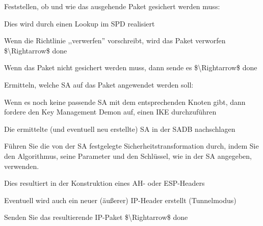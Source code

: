 \documentclass[a4paper]{article}
\begin{document}
\begin{multicols}{3}
\begin{itemize*}
            \begin{itemize*}
                  \item Feststellen, ob und wie das ausgehende Paket gesichert werden muss:
                  \begin{itemize*}
                        \item Dies wird durch einen Lookup im SPD realisiert
                        \item Wenn die Richtlinie ,,verwerfen'' vorschreibt, wird das Paket verworfen \$\textbackslash Rightarrow\$ done
                        \item Wenn das Paket nicht gesichert werden muss, dann sende es \$\textbackslash Rightarrow\$ done
                  \end{itemize*}
                  \item Ermitteln, welche SA auf das Paket angewendet werden soll:
                  \begin{itemize*} \item Wenn es noch keine passende SA mit dem entsprechenden Knoten gibt, dann fordere den Key Management Demon auf, einen IKE durchzuführen \end{itemize*}
                  \item Die ermittelte (und eventuell neu erstellte) SA in der SADB nachschlagen
                  \item Führen Sie die von der SA festgelegte Sicherheitstransformation durch, indem Sie den Algorithmus, seine Parameter und den Schlüssel, wie in der SA angegeben, verwenden.
                  \begin{itemize*}
                        \item Dies resultiert in der Konstruktion eines AH- oder ESP-Headers
                        \item Eventuell wird auch ein neuer (äußerer) IP-Header erstellt (Tunnelmodus)
                  \end{itemize*}
                  \item Senden Sie das resultierende IP-Paket \$\textbackslash Rightarrow\$ done
            \end{itemize*}
      \end{itemize*}



\end{multicols}
\end{document}
